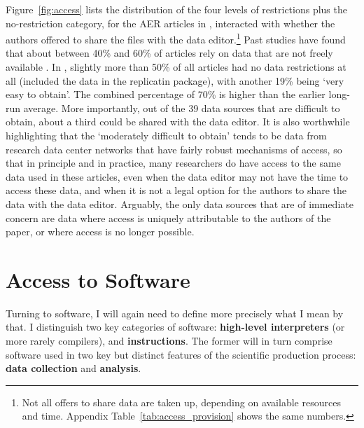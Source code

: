 \documentclass{Revue-economique}
\newcommand{\citet}{\textcite}
\begin{document}
\begin{Article} [%
	Titre={Reproducibility and Open Science in Economics},
	Auteur={Lars Vilhuber\thanks{Cornell University, lars.vilhuber@cornell.edu}}]
\begin{refsection}[Main]


Figure~\ref{fig:access} lists the distribution of the four levels of restrictions plus  the no-restriction category, for the \aerpapers{} AER articles in \aeryear{}, interacted with whether the authors offered to share the files with the data editor.\footnote{Not all offers to share data are taken up, depending on available resources and time. Appendix Table~\ref{tab:access_provision} shows the same numbers.}  
%
Past studies have found that about between 40\% and 60\% of articles rely on data that are not freely available \parencite{herbert_reproduce_2024,hamermesh_six_2013,chetty_time_2012}. 
In \aeryear{}, slightly more than 50\% of all articles had no data restrictions at all (included the data in the replicatin package), with another 19\% being `very easy to obtain'. The combined percentage of 70\% is higher than the earlier long-run average.  More importantly, out of the 39 data sources that are difficult to obtain, about a third could  be shared with the data editor. It is also worthwhile highlighting that the `moderately difficult to obtain' tends to be data from research data center networks that have fairly robust mechanisms of access, so that in principle and in practice, many researchers do have access to the same data used in these articles, even when the data editor may not have the time to access these data, and when it is not a legal option for the authors to share the data with the data editor. Arguably, the only data sources that are of immediate concern are data where access is uniquely attributable to the authors of the paper, or where access is no longer possible.










\section{Access to Software}
\label{sec:software}

Turning to software, I will again need to define more precisely what I mean by that. I distinguish two key categories of software: \textbf{high-level interpreters} (or more rarely compilers), and \textbf{instructions}. The former will in turn comprise software used in two key but distinct features of the scientific production process: \textbf{data collection} and \textbf{analysis}. 


\end{refsection}
\end{Article}
\end{document}
